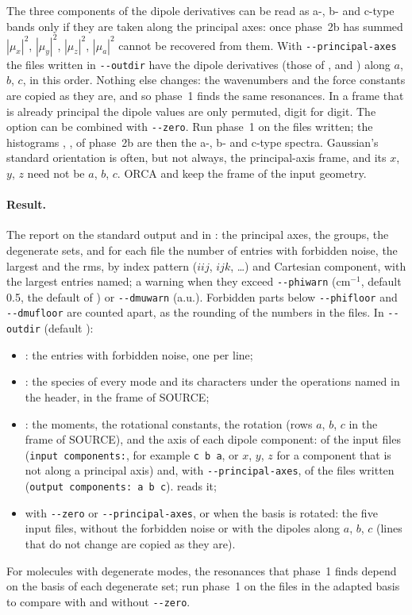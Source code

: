 The three components of the dipole derivatives can be read as a-, b- and
c-type bands only if they are taken along the principal axes: once phase~2b
has summed $|\mu_x|^2$, $|\mu_y|^2$, $|\mu_z|^2$, $|\mu_a|^2$ cannot be
recovered from them. With \texttt{-{}-principal-axes} the files written
in \texttt{-{}-outdir} have the dipole derivatives (those of
,  and ) along $a$, $b$,
$c$, in this order. Nothing else changes: the wavenumbers and the force
constants are copied as they are, and so phase~1 finds the same
resonances. In a frame that is already principal the dipole values are
only permuted, digit for digit. The option can be combined with
\texttt{-{}-zero}. Run phase~1 on the files written; the histograms
, ,  of phase~2b are then the a-,
b- and c-type spectra. Gaussian's standard orientation is often, but not
always, the principal-axis frame, and its $x$, $y$, $z$ need not be $a$,
$b$, $c$. ORCA and  keep the frame of the input geometry.

\paragraph{Result.} The report on the standard output and in
: the principal axes, the groups, the degenerate sets, and for each
file the number of entries with forbidden noise, the largest and the rms,
by index pattern ($iij$, $ijk$, \dots) and Cartesian component, with the
largest entries named; a warning when they exceed \texttt{-{}-phiwarn}
(cm$^{-1}$, default 0.5, the default of ) or
\texttt{-{}-dmuwarn} (a.u.). Forbidden parts below \texttt{-{}-phifloor}
and \texttt{-{}-dmufloor} are counted apart, as the rounding of the
numbers in the files. In \texttt{-{}-outdir} (default
):
\begin{itemize}
\item {}: the entries with forbidden noise, one per line;
\item {}: the species of every mode and its characters
  under the operations named in the header, in the frame of SOURCE;
\item {}: the moments, the rotational constants,
  the rotation (rows $a$, $b$, $c$ in the frame of SOURCE), and the axis of
  each dipole component: of the input files (\texttt{input components:},
  for example \texttt{c b a}, or $x$, $y$, $z$ for a component that is not
  along a principal axis) and, with \texttt{-{}-principal-axes}, of the
  files written (\texttt{output components: a b c}).
   reads it;
\item with \texttt{-{}-zero} or \texttt{-{}-principal-axes}, or when the
  basis is rotated: the five input files, without the forbidden noise or
  with the dipoles along $a$, $b$, $c$ (lines that do not change are
  copied as they are).
\end{itemize} For molecules
with degenerate modes, the resonances that phase~1 finds depend on the
basis of each degenerate set; run phase~1 on the files in the adapted
basis to compare with and without \texttt{-{}-zero}.

